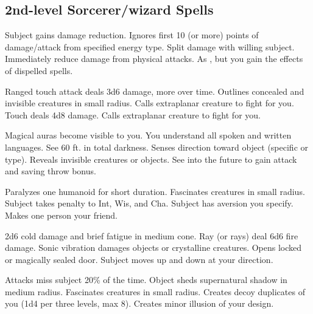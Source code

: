 \subsection{2nd-level Sorcerer/wizard Spells} 
\begin{swspelllist}
   Subject gains damage reduction.
 Ignores first 10 (or more) points of damage/attack from specified energy type.
 Split damage with willing subject.
 Immediately reduce damage from physical attacks.
 As , but you gain the effects of dispelled spells.

 Ranged touch attack deals 3d6 damage, more over time.
 Outlines concealed and invisible creatures in small radius.
 Calls extraplanar creature to fight for you.
 Touch deals 4d8 damage.
 Calls extraplanar creature to fight for you.

 Magical auras become visible to you.
 You understand all spoken and written languages.
 See 60 ft. in total darkness.
 Senses direction toward object (specific or type).
 Reveals invisible creatures or objects.
\spellheadrestricted{}
 See into the future to gain attack and saving throw bonus.

 Paralyzes one humanoid for short duration.
 Fascinates creatures in small radius.
 Subject takes  penalty to Int, Wis, and Cha.
 Subject has aversion you specify.
 Makes one person your friend.

 2d6 cold damage and brief fatigue in medium cone.
 Ray (or rays) deal 6d6 fire damage.
 Sonic vibration damages objects or crystalline creatures.
 Opens locked or magically sealed door.
 Subject moves up and down at your direction.

 Attacks miss subject 20\% of the time.
 Object sheds supernatural shadow in medium radius.
 Fascinates creatures in small radius.
 Creates decoy duplicates of you (1d4  per three levels, max 8).
 Creates minor illusion of your design.


\end{swspelllist}

